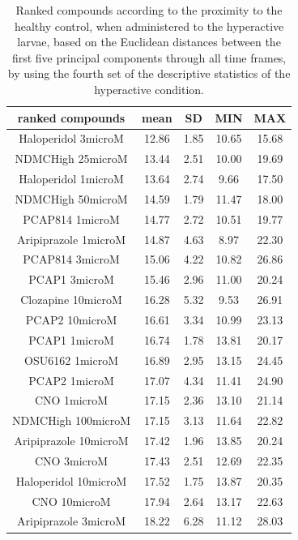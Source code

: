 \documentclass[a4paper,12pt]{article}
\begin{document}
\begin{table}[h!]\tiny
\centering
\caption{Ranked compounds according to the proximity to the healthy control, when administered to the hyperactive larvae, based on the Euclidean distances between the first five principal components through all time frames, by using the fourth set of the descriptive statistics of the hyperactive condition.}
\begin{tabular}{|c|c|c|c|c|}
\hline
ranked compounds             & mean & SD   & MIN  & MAX   \\ \hline
Haloperidol 3microM   & 12.86 & 1.85 & 10.65 & 15.68 \\ \hline
NDMCHigh 25microM     & 13.44 & 2.51 & 10.00    & 19.69 \\ \hline
Haloperidol 1microM   & 13.64 & 2.74 & 9.66  & 17.50  \\ \hline
NDMCHigh 50microM     & 14.59 & 1.79 & 11.47 & 18.00    \\ \hline
PCAP814 1microM       & 14.77 & 2.72 & 10.51 & 19.77 \\ \hline
Aripiprazole 1microM  & 14.87 & 4.63 & 8.97  & 22.30  \\ \hline
PCAP814 3microM       & 15.06 & 4.22 & 10.82 & 26.86 \\ \hline
PCAP1 3microM         & 15.46 & 2.96 & 11.00    & 20.24 \\ \hline
Clozapine 10microM    & 16.28 & 5.32 & 9.53  & 26.91 \\ \hline
PCAP2 10microM        & 16.61 & 3.34 & 10.99 & 23.13 \\ \hline
PCAP1 1microM         & 16.74 & 1.78 & 13.81 & 20.17 \\ \hline
OSU6162 1microM       & 16.89 & 2.95 & 13.15 & 24.45 \\ \hline
PCAP2 1microM         & 17.07 & 4.34 & 11.41 & 24.90  \\ \hline
CNO 1microM           & 17.15 & 2.36 & 13.10  & 21.14 \\ \hline
NDMCHigh 100microM    & 17.15 & 3.13 & 11.64 & 22.82 \\ \hline
Aripiprazole 10microM & 17.42 & 1.96 & 13.85 & 20.24 \\ \hline
CNO 3microM           & 17.43 & 2.51 & 12.69 & 22.35 \\ \hline
Haloperidol 10microM  & 17.52 & 1.75 & 13.87 & 20.35 \\ \hline
CNO 10microM          & 17.94 & 2.64 & 13.17 & 22.63 \\ \hline
Aripiprazole 3microM  & 18.22 & 6.28 & 11.12 & 28.03 \\ \hline

\end{tabular}
\end{table}
\end{document}
